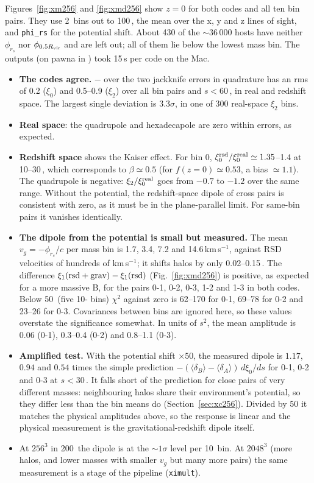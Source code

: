 Figures~\ref{fig:xm256} and \ref{fig:xmd256} show $z=0$ for both codes and all ten bin pairs. They use 2\,\Mpch{}
bins out to 100\,\Mpch, the mean over the x, y and z lines of sight, and \texttt{phi\_rs} for the potential shift.
About 430 of the $\sim$36\,000 hosts have neither $\phi_{r_s}$ nor $\phi_{0.5R_{\rm vir}}$ and are left out; all of
them lie below the lowest mass bin. The outputs (on pawna in ) took
15\,s per code on the Mac.
\begin{itemize}
\item \textbf{The codes agree.} \pkd{} $-$ \gad{} over the two jackknife errors in quadrature has an rms of 0.2
($\xi_0$) and 0.5--0.9 ($\xi_2$) over all bin pairs and $s<60$\,\Mpch, in real and redshift space. The largest single
deviation is $3.3\sigma$, in one of 300 real-space $\xi_2$ bins.
\item \textbf{Real space}: the quadrupole and hexadecapole are zero within errors, as expected.
\item \textbf{Redshift space} shows the Kaiser effect. For bin 0, $\xi_0^{\rm rsd}/\xi_0^{\rm real}\simeq1.35$--1.4
at 10--30\,\Mpch, which corresponds to $\beta\simeq0.5$ (for $f(z{=}0)\simeq0.53$, a bias $\simeq1.1$). The
quadrupole is negative: $\xi_2/\xi_0^{\rm real}$ goes from $-0.7$ to $-1.2$ over the same range. Without the
potential, the redshift-space dipole of cross pairs is consistent with zero, as it must be in the plane-parallel
limit. For same-bin pairs it vanishes identically.
\item \textbf{The dipole from the potential is small but measured.} The mean $v_g=-\phi_{r_s}/c$ per mass bin is
1.7, 3.4, 7.2 and 14.6\,km\,s$^{-1}$, against RSD velocities of hundreds of km\,s$^{-1}$; it shifts halos by only
0.02--0.15\,\Mpch. The difference $\xi_1({\rm rsd+grav})-\xi_1({\rm rsd})$ (Fig.~\ref{fig:xmd256}) is positive, as
expected for a more massive B, for the pairs 0-1, 0-2, 0-3, 1-2 and 1-3 in both codes. Below 50\,\Mpch{} (five
10-\Mpch{} bins) $\chi^2$ against zero is 62--170 for 0-1, 69--78 for 0-2 and 23--26 for 0-3. Covariances between
bins are ignored here, so these values overstate the significance somewhat. In units of $s^2$, the mean amplitude
is 0.06 (0-1), 0.3--0.4 (0-2) and 0.8--1.1 (0-3).
\item \textbf{Amplified test.} With the potential shift $\times50$, the measured dipole is $1.17$, $0.94$ and
$0.54$ times the simple prediction $-(\langle\delta_B\rangle-\langle\delta_A\rangle)\,d\xi_0/ds$ for 0-1, 0-2 and
0-3 at $s<30$\,\Mpch. It falls short of the prediction for close pairs of very different masses: neighbouring halos
share their environment's potential, so they differ less than the bin means do (Section~\ref{sec:xc256}). Divided
by 50 it matches the physical amplitudes above, so the response is linear and the physical measurement is the
gravitational-redshift dipole itself.
\item At $256^3$ in 200\,\Mpch{} the dipole is at the $\sim1\sigma$ level per 10\,\Mpch{} bin. At $2048^3$ (more
halos, and lower masses with smaller $v_g$ but many more pairs) the same measurement is a stage of the pipeline
(\texttt{ximult}).
\end{itemize}

